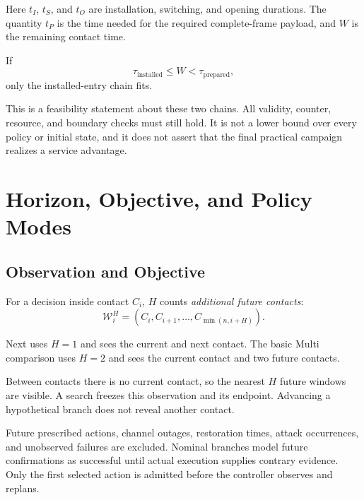 \documentclass[conference]{IEEEtran}
\begin{document}
Here $t_I$, $t_S$, and $t_O$ are installation, switching,
and opening durations.
The quantity $t_P$ is the time needed for the required
complete-frame payload, and $W$ is the remaining contact time.

If
\begin{equation}
    \tau_{\mathrm{installed}}
    \leq W
    <
    \tau_{\mathrm{prepared}},
    \label{eq:opportunity}
\end{equation}
only the installed-entry chain fits.

This is a feasibility statement about these two chains.
All validity, counter, resource, and boundary checks must
still hold.
It is not a lower bound over every policy or initial state,
and it does not assert that the final practical campaign
realizes a service advantage.


\section{Horizon, Objective, and Policy Modes}
\label{sec:planning}

\subsection{Observation and Objective}

For a decision inside contact $C_i$, $H$ counts
\emph{additional future contacts}:
\begin{equation}
    \mathcal{W}_i^H=
    \left(
        C_i,C_{i+1},\ldots,C_{\min(n,i+H)}
    \right).
    \label{eq:horizon}
\end{equation}

Next uses $H=1$ and sees the current and next contact.
The basic Multi comparison uses $H=2$ and sees the current
contact and two future contacts.

Between contacts there is no current contact, so the nearest
$H$ future windows are visible.
A search freezes this observation and its endpoint.
Advancing a hypothetical branch does not reveal another contact.

Future prescribed actions, channel outages, restoration times,
attack occurrences, and unobserved failures are excluded.
Nominal branches model future confirmations as successful
until actual execution supplies contrary evidence.
Only the first selected action is admitted before the
controller observes and replans.
\end{document}
